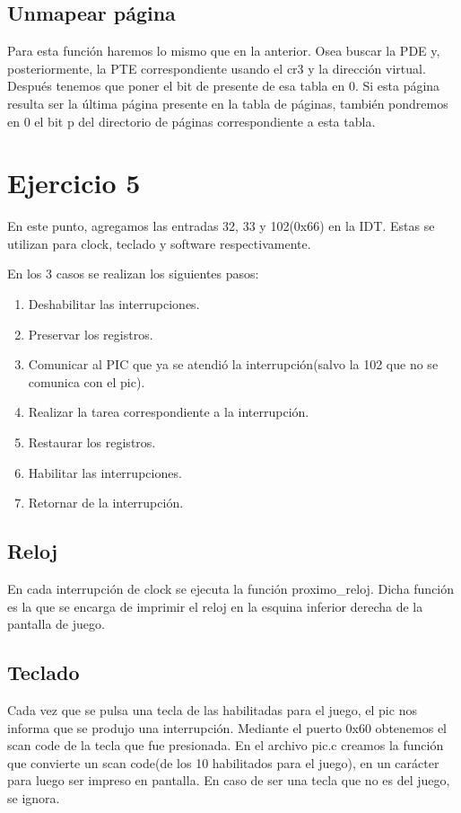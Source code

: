 \documentclass[a4paper]{article}
\begin{document}
\subsection{Unmapear página}

Para esta función haremos lo mismo que en la anterior. Osea buscar la PDE y, posteriormente, la PTE correspondiente usando el cr3 y la dirección virtual. Después tenemos que poner el bit de presente de esa tabla en 0. Si esta página resulta ser la última página presente en la tabla de páginas, también pondremos en 0 el bit p del directorio de páginas correspondiente a esta tabla.

\section{Ejercicio 5}

En este punto, agregamos las entradas 32, 33 y 102(0x66) en la IDT. Estas se utilizan para clock, teclado y software respectivamente.

En los 3 casos se realizan los siguientes pasos:
\begin{enumerate}
  \item  Deshabilitar las interrupciones.
\item Preservar los registros.
\item Comunicar al PIC que ya se atendió la interrupción(salvo la 102 que no se comunica con el pic).
\item Realizar la tarea correspondiente a la interrupción.
\item Restaurar los registros.
\item Habilitar las interrupciones.
\item Retornar de la interrupción.
\end{enumerate}

\subsection{Reloj}

En cada interrupción de clock se ejecuta la función proximo\_reloj. Dicha función es la que se encarga de imprimir el reloj en la esquina inferior derecha de la pantalla de juego.

\subsection{Teclado}

Cada vez que se pulsa una tecla de las habilitadas para el juego, el pic nos informa que se produjo una interrupción. Mediante el puerto 0x60 obtenemos el scan code de la tecla que fue presionada. En el archivo pic.c creamos la función que convierte un scan code(de los 10 habilitados para el juego), en un carácter para luego ser impreso en pantalla. En caso de ser una tecla que no es del juego, se ignora.
\end{document}
